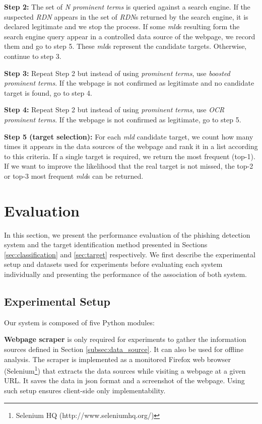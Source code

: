 \documentclass[10pt,conference,compsocconf,letterpaper]{IEEEtran}
\begin{document}
\noindent\textbf{Step 2:}
The set of \textit{N prominent terms} is queried against a search engine.
If the suspected \textit{RDN} appears in the set of \textit{RDN}s returned by the search engine, it is declared legitimate and we stop the process.
If some \textit{mld}s resulting form the search engine query appear in a controlled data source of the webpage, we record them and go to step 5. These \textit{mld}s represent the candidate targets. Otherwise, continue to step 3.

\noindent\textbf{Step 3:}
Repeat Step 2 but instead of using \textit{prominent terms}, use \textit{boosted prominent terms}. If the webpage is not confirmed as legitimate and no candidate target is found, go to step 4.

\noindent\textbf{Step 4:}
Repeat Step 2 but instead of using \textit{prominent terms}, use \textit{OCR prominent terms}. If the webpage is not confirmed as legitimate, go to step 5.

\noindent\textbf{Step 5 (target selection):}
For each \textit{mld} candidate target, we count how many times it appears in the data sources of the webpage and rank it in a list according to this criteria.
If a single target is required, we return the most frequent (top-1). If we want to improve the likelihood that the real target is not missed, the top-2 or top-3 most frequent \textit{mld}s can be returned.
\section{Evaluation}

In this section, we present the performance evaluation of the phishing detection system and the target identification method presented in Sections \ref{sec:classification} and \ref{sec:target} respectively. 
\iffullversion
We first describe the experimental setup and datasets used for experiments before evaluating each system individually and presenting the performance of the association of both system. 
\fi

\subsection{Experimental Setup}

Our system is composed of five Python modules:

\noindent\textbf{Webpage scraper} is only required for experiments to gather the information sources defined in Section \ref{subsec:data_source}. It can also be used for offline analysis. The scraper is implemented as a monitored Firefox web browser (Selenium\footnote{Selenium HQ (http://www.seleniumhq.org/)}) that extracts the data sources while visiting a webpage at a given URL. It saves the data in json format and a screenshot of the webpage. 
\iffullversion
Using such setup ensures client-side only implementability.
\fi
\end{document}
